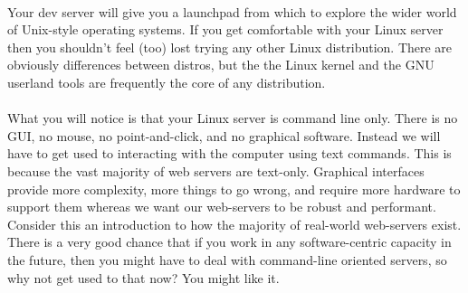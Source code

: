 \documentclass[12pt, a4paper, oneside]{book}
\begin{document}
\paragraph{} Your dev server will give you a launchpad from which to explore the wider world of Unix-style operating systems. If you get comfortable with your Linux server then you shouldn't feel (too) lost trying any other Linux distribution. There are obviously differences between distros, but the the Linux kernel and the GNU userland tools are frequently the core of any distribution.

\paragraph{} What you will notice is that your Linux server is command line only. There is no GUI, no mouse, no point-and-click, and no graphical software. Instead we will have to get used to interacting with the computer using text commands. This is because the vast majority of web servers are text-only. Graphical interfaces provide more complexity, more things to go wrong, and require more hardware to support them whereas we want our web-servers to be robust and performant. Consider this an introduction to how the majority of real-world web-servers exist. There is a very good chance that if you work in any software-centric capacity in the future, then you might have to deal with command-line oriented servers, so why not get used to that now? You might like it.
\end{document}
